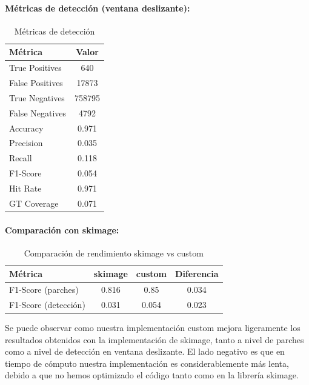 \documentclass[11pt,a4paper]{article}
\begin{document}
\paragraph{Métricas de detección (ventana deslizante):}
\begin{table}[H]
    \centering
    \caption{Métricas de detección}
    \label{tab:hog_custom_detection}
    \begin{tabular}{lc}
        \toprule
        \textbf{Métrica} & \textbf{Valor} \\
        \midrule
        True Positives & 640\\
        False Positives & 17873\\
        True Negatives & 758795\\
        False Negatives & 4792\\
        Accuracy & 0.971\\
        Precision & 0.035\\
        Recall & 0.118\\
        F1-Score & 0.054\\
        Hit Rate & 0.971\\
        GT Coverage & 0.071\\
        \bottomrule
    \end{tabular}
\end{table}

\paragraph{Comparación con skimage:}
\begin{table}[H]
    \centering
    \caption{Comparación de rendimiento skimage vs custom}
    \label{tab:hog_comparison}
    \begin{tabular}{lccc}
        \toprule
        \textbf{Métrica} & \textbf{skimage} & \textbf{custom} & \textbf{Diferencia} \\
        \midrule
        F1-Score (parches) & 0.816 & 0.85 & 0.034 \\
        F1-Score (detección) & 0.031 & 0.054 & 0.023 \\
        \bottomrule
    \end{tabular}
\end{table}

Se puede observar como nuestra implementación custom mejora ligeramente
los resultados obtenidos con la implementación de skimage, tanto a nivel
de parches como a nivel de detección en ventana deslizante. El lado negativo es que
en tiempo de cómputo nuestra implementación es considerablemente más lenta,
debido a que no hemos optimizado el código tanto como en la librería skimage.
\end{document}

